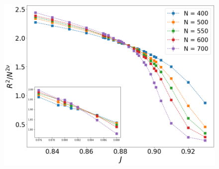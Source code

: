 \documentclass{beamer}
\begin{document}
\begin{frame}
\begin{minipage}{0.48\linewidth}
	\end{minipage}%
	\hfill
	\begin{minipage}{0.48\linewidth}
		\begin{figure}[h]
			\centering
			\includegraphics[scale=0.1822]{3_rscaling_longchains.png} 
			\label{ph}
		\end{figure}
	\end{minipage}
\end{frame}
\end{document}
